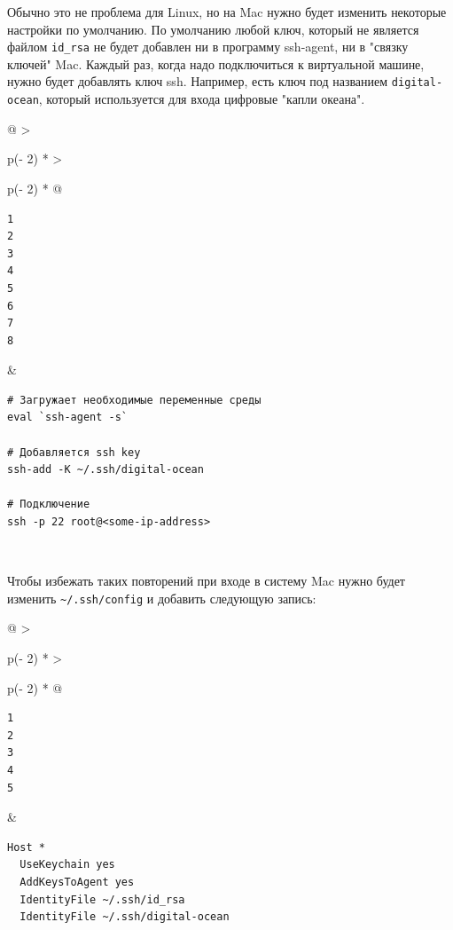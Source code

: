 \documentclass{report}
\begin{document}
Обычно это не проблема для Linux, но на Mac нужно будет изменить
некоторые настройки по умолчанию. По умолчанию любой ключ, который не
является файлом \texttt{id\_rsa} не будет добавлен ни в программу
ssh-agent, ни в "связку ключей" Mac. Каждый раз, когда надо подключиться
к виртуальной машине, нужно будет добавлять ключ ssh. Например, есть
ключ под названием \texttt{digital-ocean}, который используется для
входа цифровые "капли океана".

\begin{longtable}[]{@{}
  >{\raggedright\arraybackslash}p{(\columnwidth - 2\tabcolsep) * }
  >{\raggedright\arraybackslash}p{(\columnwidth - 2\tabcolsep) * }@{}}
\toprule
\endhead
\begin{minipage}[t]{\linewidth}\raggedright
\begin{verbatim}
1
2
3
4
5
6
7
8
\end{verbatim}
\end{minipage} & \begin{minipage}[t]{\linewidth}\raggedright
\begin{verbatim}
# Загружает необходимые переменные среды
eval `ssh-agent -s`

# Добавляется ssh key
ssh-add -K ~/.ssh/digital-ocean

# Подключение
ssh -p 22 root@<some-ip-address>
\end{verbatim}
\end{minipage} \\ \addlinespace
\bottomrule
\end{longtable}

Чтобы избежать таких повторений при входе в систему Mac нужно будет
изменить \texttt{\textasciitilde{}/.ssh/config} и добавить следующую
запись:

\begin{longtable}[]{@{}
  >{\raggedright\arraybackslash}p{(\columnwidth - 2\tabcolsep) * }
  >{\raggedright\arraybackslash}p{(\columnwidth - 2\tabcolsep) * }@{}}
\toprule
\endhead
\begin{minipage}[t]{\linewidth}\raggedright
\begin{verbatim}
1
2
3
4
5
\end{verbatim}
\end{minipage} & \begin{minipage}[t]{\linewidth}\raggedright
\begin{verbatim}
Host *
  UseKeychain yes
  AddKeysToAgent yes
  IdentityFile ~/.ssh/id_rsa
  IdentityFile ~/.ssh/digital-ocean
\end{verbatim}
\end{minipage} \\ \addlinespace
\bottomrule
\end{longtable}
\end{document}
